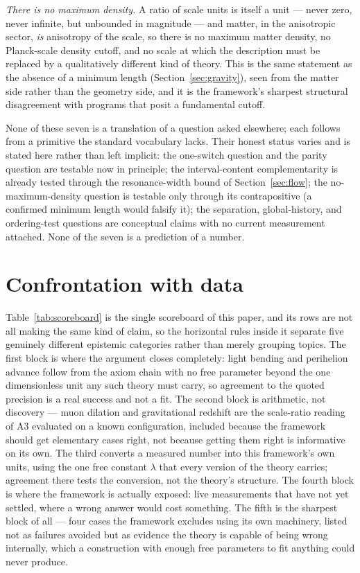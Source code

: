 \documentclass[pdflatex,sn-mathphys-num]{sn-jnl}
\theoremstyle{thmstyleone}
\theoremstyle{thmstylethree}
\theoremstyle{thmstyletwo}
\begin{document}
\emph{There is no maximum density.} A ratio of scale units is itself a
unit — never zero, never infinite, but unbounded in magnitude — and
matter, in the anisotropic sector, \emph{is} anisotropy of the scale, so
there is no maximum matter density, no Planck-scale density cutoff, and
no scale at which the description must be replaced by a qualitatively
different kind of theory. This is the same statement as the absence of a
minimum length (Section~\ref{sec:gravity}), seen from the matter side
rather than the geometry side, and it is the framework's sharpest
structural disagreement with programs that posit a fundamental cutoff.

None of these seven is a translation of a question asked elsewhere; each
follows from a primitive the standard vocabulary lacks. Their honest
status varies and is stated here rather than left implicit: the
one-switch question and the parity question are testable now in
principle; the interval-content complementarity is already tested
through the resonance-width bound of Section~\ref{sec:flow}; the
no-maximum-density question is testable only through its contrapositive
(a confirmed minimum length would falsify it); the separation, global-history,
and ordering-test questions are conceptual claims with no current
measurement attached. None of the seven is a prediction of a number.

\section{Confrontation with data}\label{sec:data}

Table~\ref{tab:scoreboard} is the single scoreboard of this paper, and
its rows are not all making the same kind of claim, so the horizontal
rules inside it separate five genuinely different epistemic categories
rather than merely grouping topics. The first block is where the
argument closes completely: light bending and perihelion advance follow
from the axiom chain with no free parameter beyond the one dimensionless
unit any such theory must carry, so agreement to the quoted precision is
a real success and not a fit. The second block is arithmetic, not
discovery — muon dilation and gravitational redshift are the scale-ratio
reading of A3 evaluated on a known configuration, included because the
framework should get elementary cases right, not because getting them
right is informative on its own. The third converts a measured number
into this framework's own units, using the one free constant $\lambda$
that every version of the theory carries; agreement there tests the
conversion, not the theory's structure. The fourth block is where the
framework is actually exposed: live measurements that have not yet
settled, where a wrong answer would cost something. The fifth is the
sharpest block of all — four cases the framework excludes using its own
machinery, listed not as failures avoided but as evidence the theory is
capable of being wrong internally, which a construction with enough free
parameters to fit anything could never produce.
\end{document}
